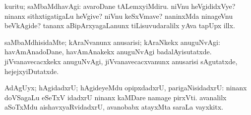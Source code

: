{{  kuritu; saMbaMdhavAgi:  avaroDane tALemxyiMdiru.  niVnu heVgididxVye? ninanx sithxtigatigaLu heVgive?
  niVnu keSxVmave?  naninxMda ninageVnu beVkAgide?  tananx aBipArxyagaLanunx
 tiLisuvudaralilx yAva tapUpx illx. 

  saMbaMdhisidaMte;
 kAraNvanunx anusarisi; kAraNkekx anuguNvAgi:  havAmAnadoDane, havAmAnakekx anuguNvAgi
 badalAyisutatxde. 
 jiVvanavecacxkekx anuguNvAgi, jiVvanavecacxvanunx anusarisi
 sAgutatxde, hejejxyiDutatxde. 

  AdAgUyx; hAgidadxrU;
 hAgideyeMdu opipxdadxrU, parigaNisidadxrU:  ninanx doVSagaLu eSeTxV idadxrU ninanx
 kaMDare namage pirxVti.  avanalilx aSoTxMdu aishavxyaRvidadxrU, avanobabx
 atayxMta saraLa vayxkitx.}}
 
